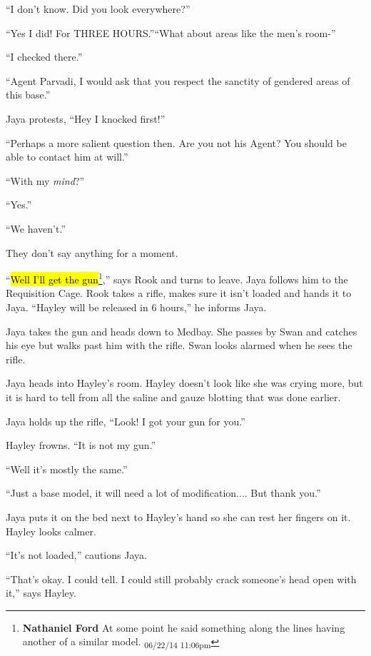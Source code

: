 ``I don't know.  Did you look everywhere?''

``Yes I did!  For THREE HOURS.''``What about areas like the men's room-''

``I checked there.''

``Agent Parvadi, I would ask that you respect the sanctity of gendered areas of this base.''

Jaya protests, ``Hey I knocked first!''

``Perhaps a more salient question then. Are you not his Agent?  You should be able to contact him at will.''

``With my \textit{mind}?''

``Yes.''

``We haven't.''

They don't say anything for a moment.

``\hl{Well I'll get the gun}\footnote{\textbf{Nathaniel Ford }At some point he said something along the lines having another of a similar model. \textsubscript{06/22/14 11:06pm}},'' says Rook and turns to leave.  Jaya follows him to the Requisition Cage.  Rook takes a rifle, makes sure it isn't loaded and hands it to Jaya.  ``Hayley will be released in 6 hours,'' he informs Jaya.





Jaya takes the gun and heads down to Medbay.  She passes by Swan and catches his eye but walks past him with the rifle.  Swan looks alarmed when he sees the rifle.



Jaya heads into Hayley's room.  Hayley doesn't look like she was crying more, but it is hard to tell from all the saline and gauze blotting that was done earlier.

Jaya holds up the rifle, ``Look!  I got your gun for you.''

Hayley frowns.  ``It is not my gun.''

``Well it's mostly the same.''

``Just a base model, it will need a lot of modification.... But thank you.''

Jaya puts it on the bed next to Hayley's hand so she can rest her fingers on it.  Hayley looks calmer.  

``It's not loaded,'' cautions Jaya.

``That's okay.  I could tell.   I could still probably crack someone's head open with it,'' says Hayley.

